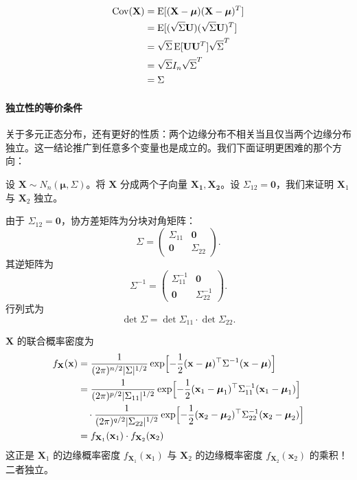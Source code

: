 \begin{align*}
\operatorname{Cov}(\mathbf{X})
&= \operatorname{E}[(\mathbf{X} - \boldsymbol{\mu})(\mathbf{X} - \boldsymbol{\mu})^T] \\
&= \operatorname{E}[(\sqrt{\Sigma} \mathbf{U})(\sqrt{\Sigma} \mathbf{U})^T] \\
&= \sqrt{\Sigma} \operatorname{E}[\mathbf{U} \mathbf{U}^T] \sqrt{\Sigma}^T\\
&= \sqrt{\Sigma} I_n \sqrt{\Sigma}^T\\
&= \Sigma
\end{align*}

\paragraph{独立性的等价条件}
关于多元正态分布，还有更好的性质：两个边缘分布不相关当且仅当两个边缘分布独立。这一结论推广到任意多个变量也是成立的。我们下面证明更困难的那个方向：

设 $\mathbf{X} \sim N_n(\boldsymbol{\mu}, \Sigma)$。将 $\mathbf{X}$ 分成两个子向量 $\mathbf{X_1}, \mathbf{X_2}$。设 $\Sigma_{12} = \mathbf{0}$，我们来证明 $\mathbf{X}_1$ 与 $\mathbf{X}_2$ 独立。

由于 $\Sigma_{12} = \mathbf{0}$，协方差矩阵为分块对角矩阵：
\[
\Sigma = \begin{pmatrix} \Sigma_{11} & \mathbf{0} \\ \mathbf{0} & \Sigma_{22} \end{pmatrix}.
\]
其逆矩阵为
\[
\Sigma^{-1} = \begin{pmatrix} \Sigma_{11}^{-1} & \mathbf{0} \\ \mathbf{0} & \Sigma_{22}^{-1} \end{pmatrix}.
\]
行列式为
\[
\det \Sigma = \det \Sigma_{11} \cdot \det \Sigma_{22}.
\]

$\mathbf{X}$ 的联合概率密度为
\begin{align*}
f_{\mathbf{X}}(\mathbf{x}) 
&= \frac{1}{(2\pi)^{n/2} |\Sigma|^{1/2}} 
\exp\Bigl[ -\frac{1}{2} (\mathbf{x} - \boldsymbol{\mu})^\top \Sigma^{-1} (\mathbf{x} - \boldsymbol{\mu}) \Bigr] \\
&= \frac{1}{(2\pi)^{p/2} |\Sigma_{11}|^{1/2}} 
\exp\Bigl[ -\frac{1}{2} (\mathbf{x}_1 - \boldsymbol{\mu}_1)^\top \Sigma_{11}^{-1} (\mathbf{x}_1 - \boldsymbol{\mu}_1) \Bigr] \\
&\quad \cdot
\frac{1}{(2\pi)^{q/2} |\Sigma_{22}|^{1/2}} 
\exp\Bigl[ -\frac{1}{2} (\mathbf{x}_2 - \boldsymbol{\mu}_2)^\top \Sigma_{22}^{-1} (\mathbf{x}_2 - \boldsymbol{\mu}_2) \Bigr]\\
& = f_{\mathbf{X}_1}(\mathbf{x}_1) \cdot f_{\mathbf{X}_2}(\mathbf{x}_2)
\end{align*}
这正是 $\mathbf{X}_1$ 的边缘概率密度 $f_{\mathbf{X}_1}(\mathbf{x}_1)$ 与 $\mathbf{X}_2$ 的边缘概率密度 $f_{\mathbf{X}_2}(\mathbf{x}_2)$ 的乘积！二者独立。

